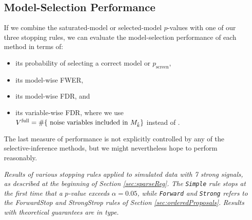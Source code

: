 \documentclass{article}
\begin{document}
\subsection{Model-Selection Performance}

If we combine the saturated-model or selected-model $p$-values with one of our three stopping rules, we can evaluate the model-selection performance of each method in terms of:
\begin{itemize}
\item its probability of selecting a correct model or $p_{\text{screen}}$,
\item its model-wise FWER,
\item its model-wise FDR, and
\item its variable-wise FDR, where we use $V^{\text{full}}= \#\{\text{ noise variables included in } M_{\hat{k}}\}$ instead of .
\end{itemize} 
The last measure of performance is not explicitly controlled by any of the selective-inference methods, but we might nevertheless hope to perform reasonably.


\begin{table}[ht]
\centering

\caption[tab:stopping]{\em Results of various stopping rules applied to simulated data with 7 strong signals,  as described at the beginning of Section \ref{sec:sparseReg}.
The {\tt Simple} rule stops at the first time that a $p$-value exceeds $\alpha=0.05$, while {\tt Forward} and {\tt Strong} refers to the ForwardStop and StrongStrop rules of Section \ref{sec:orderedProposals}. Results with theoretical guarantees are in  type.}
\label{tab:stopping05}
\end{table}
\end{document}
